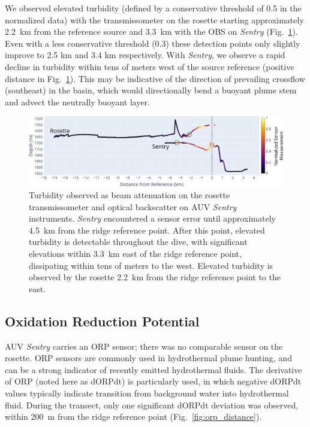 We observed elevated turbidity (defined by a conservative threshold of 0.5 in the normalized data) with the transmissometer on the rosette starting approximately \SI{2.2}{\kilo\meter} from the reference source and \SI{3.3}{\kilo\meter} with the OBS on \emph{Sentry} (Fig.~\ref{fig:turbidity_distance}). Even with a less conservative threshold (0.3) these detection points only slightly improve to 2.5 km and 3.4 km respectively. With \emph{Sentry}, we observe a rapid decline in turbidity within tens of meters west of the source reference (positive distance in Fig.~\ref{fig:turbidity_distance}). This may be indicative of the direction of prevailing crossflow (southeast) in the basin, which would directionally bend a buoyant plume stem and advect the neutrally buoyant layer.

\begin{figure}[h!]
    \centering
    \includegraphics[width=\columnwidth]{figures/chap3_turbidity_over_distance.jpg}
    \caption[Turbidity measurements collected during transect]{Turbidity observed as beam attenuation on the rosette transmissometer and optical backscatter on AUV \emph{Sentry} instruments. \emph{Sentry} encountered a sensor error until approximately \SI{4.5}{\kilo\meter} from the ridge reference point. After this point, elevated turbidity is detectable throughout the dive, with significant elevations within \SI{3.3}{\kilo\meter} east of the ridge reference point, dissipating within tens of meters to the west. Elevated turbidity is observed by the rosette \SI{2.2}{\kilo\meter} from the ridge reference point to the east.}
    \label{fig:turbidity_distance}
\end{figure}


\subsection{Oxidation Reduction Potential}
AUV \emph{Sentry} carries an ORP sensor; there was no comparable sensor on the rosette. ORP sensors are commonly used in hydrothermal plume hunting, and can be a strong indicator of recently emitted hydrothermal fluids. The derivative of ORP (noted here as dORPdt) is particularly used, in which negative dORPdt values typically indicate transition from background water into hydrothermal fluid. During the transect, only one significant dORPdt deviation was observed, within \SI{200}{\meter} from the ridge reference point (Fig.~\ref{fig:orp_distance}). 

